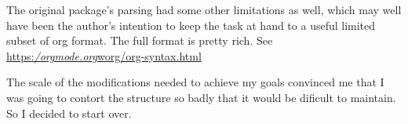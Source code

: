 \documentclass[11pt]{article}
\begin{document}
  The original package's parsing had some other limitations as well, which may well have
  been the author's intention to keep the task at hand to a useful limited subset of org
format. The full format is pretty rich. See
\href{https://orgmode.org/worg/org-syntax.html}{https:\emph{/orgmode.org}worg/org-syntax.html}

\vspace{\baselineskip}
  The scale of the modifications needed to achieve my goals convinced me that I was going
  to contort the structure so badly that it would be dificult to maintain. So I decided
  to start over.
\vspace{\baselineskip}

\printindex
\end{document}
